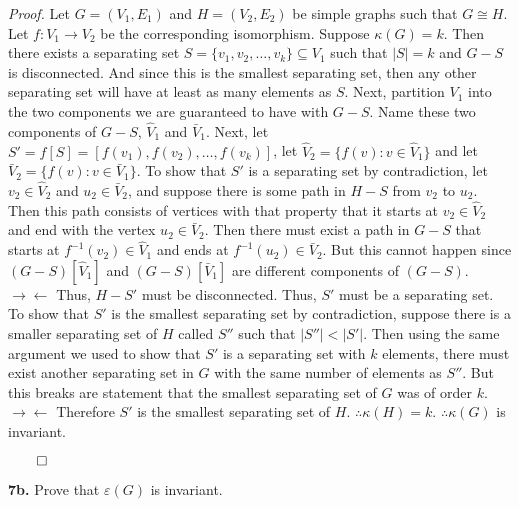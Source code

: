 \documentclass{article}
\begin{document}
\textit{Proof.} Let \(G=(V_1, E_1) \) and \(H=(V_2,E_2)\) be simple graphs such that \(G \cong H\). Let \(f:V_1 \rightarrow V_2\) be the corresponding isomorphism. Suppose \(\kappa(G)=k\). Then there exists a separating set \(S= \{v_1,v_2, \ldots, v_k\} \subseteq V_1 \) such that \( |S| = k \) and \(G-S\) is disconnected. And since this is the smallest separating set, then any other separating set will have at least as many elements as \(S\). Next, partition \(V_1\) into the two components we are guaranteed to have with \(G-S\). Name these two components of \(G-S\), \(\hat V_1\) and \(\bar V_1\). Next, let \(S' = f[S] = [f(v_1), f(v_2), \ldots, f(v_k)]\), let \( \hat V_2 = \{ f(v) : v \in \hat V_1\} \)  and let \( \bar V_2 = \{ f(v) : v \in \bar V_1\} \).  To show that \(S'\) is a separating set by contradiction, let \(v_2 \in \hat V_2 \) and \(u_2 \in \bar V_2\), and suppose there is some path in \(H-S\) from \(v_2 \) to \(u_2\). Then this path consists of vertices with that property that it starts at \( v_2 \in \hat V_2 \) and end with the vertex \(u_2 \in \bar V_2\). Then there must exist a path in \(G-S\) that starts at \( f^{-1}(v_2) \in \hat V_1\) and ends at \(f^{-1}(u_2) \in \bar V_2 \). But this cannot happen since \((G-S)[\hat V_1] \) and \( (G-S)[\bar V_1]\) are different components of \( (G-S)\). \( \rightarrow\!\leftarrow\) Thus, \(H-S'\) must be disconnected. Thus, \(S'\) must be a separating set. To show that \(S'\) is the smallest separating set by contradiction, suppose there is a smaller separating set of \(H\) called \(S''\) such that \( |S''| <|S'|\). Then using the same argument we used to show that \(S'\) is a separating set with \(k\) elements,  there must exist another separating set in \(G\) with the same number of elements as \(S''\). But this breaks are statement that the smallest separating set of \(G\) was of order \(k\). \( \rightarrow\!\leftarrow\) Therefore \(S'\) is the smallest separating set of \(H\). \(\therefore \kappa(H)=k\). \(\therefore \kappa(G)\) is invariant.
\begin{flushright}
 \(\qed\) 
\end{flushright}


\vspace{2mm}

\textbf{7b.} Prove that \(\varepsilon(G)\) is invariant. 

\vspace{3mm}
\end{document}

